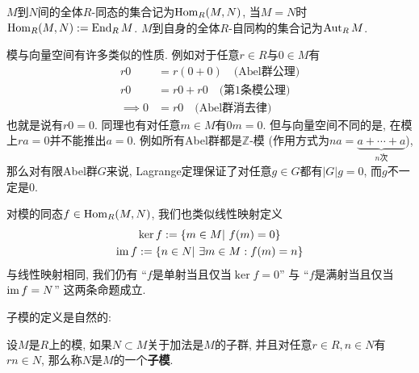 \begin{sym}
    $M$到$N$间的全体$R$-同态的集合记为$\operatorname{Hom}_R(M,N)$, 当$M=N$时$\operatorname{Hom}_R(M,N):=\operatorname{End}_RM$.
    $M$到自身的全体$R$-自同构的集合记为$\operatorname{Aut}_RM$.
\end{sym}

\begin{eg}
    模与向量空间有许多类似的性质.
    例如对于任意$r\in R$与$0\in M$有
    \begin{align*}
        r0 & =  r(0+0) \quad \text{(Abel群公理)}\\
        r0 & =  r0+r0 \quad \text{(第1条模公理)}\\
        \implies 0 & =  r0 \quad \text{(Abel群消去律)}
    \end{align*}
    也就是说有$r0=0$.
    同理也有对任意$m\in M$有$0m=0$.
    但与向量空间不同的是, 在模上$ra=0$并不能推出$a=0$.
    例如所有Abel群都是$\mathbb{Z}$-模 (作用方式为$na=\underbrace{a+\cdots+a}_{n\text{次}}$), 那么对有限Abel群$G$来说,
    Lagrange定理保证了对任意$g\in G$都有$|G|g=0$, 而$g$不一定是$0$.

    对模的同态$f\in\operatorname{Hom}_R(M,N)$, 我们也类似线性映射定义
    \begin{gather*}
        \ker{f}:=\{m\in M|\ f(m)=0\}\\
        \operatorname{im}{f}:=\{n\in N|\ \exists m\in M: f(m)=n\}
    \end{gather*}
    与线性映射相同, 我们仍有 ``$f$是单射当且仅当$\ker{f}=0$'' 与 ``$f$是满射当且仅当$\operatorname{im}{f}=N$'' 这两条命题成立.
\end{eg}

子模的定义是自然的:
\begin{defn}\label{def of submodule}
    设$M$是$R$上的模, 如果$N\subset M$关于加法是$M$的子群, 并且对任意$r\in R, n\in N$有$rn\in N$, 那么称$N$是$M$的一个\textbf{子模}.
\end{defn}

